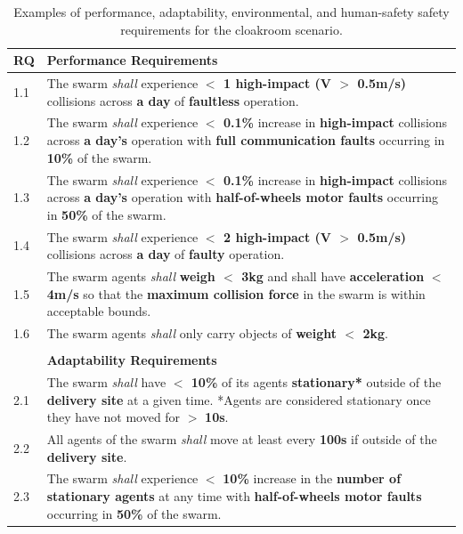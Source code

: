 \documentclass[runningheads]{llncs}
\begin{document}
\begin{table}[!t]
	\centering
	\caption{Examples of performance, adaptability, environmental, and human-safety safety requirements for the cloakroom scenario.}
	\label{tab:reqs}
	\begin{tabular}{p{5mm} p{125mm} }%
		\textbf{RQ} & \textbf{Performance Requirements}\\
		\hline
		1.1 & The swarm \emph{shall} experience \textbf{$<$ 1 high-impact (V $>$ 0.5m/s)} collisions across \textbf{a day} of \textbf{faultless} operation. \\ 
		\hline
		1.2 & The swarm \emph{shall} experience \textbf{$<$ 0.1\%} increase in \textbf{high-impact} collisions across \textbf{a day's} operation with \textbf{full communication faults} occurring in \textbf{10\%} of the swarm.\\ 
		\hline
		1.3 & The swarm \emph{shall} experience \textbf{$<$ 0.1\%} increase in \textbf{high-impact} collisions across \textbf{a day's} operation with \textbf{half-of-wheels motor faults} occurring in \textbf{50\%} of the swarm.	\\	
		\hline
		1.4 & The swarm \emph{shall} experience \textbf{$<$ 2 high-impact (V $>$ 0.5m/s)} collisions across \textbf{a day} of \textbf{faulty} operation.  \\		 		
		\hline
        1.5 & The swarm agents \emph{shall} \textbf{weigh $<$ 3kg} and shall have \textbf{acceleration} \textbf{$<$ 4m/s} so that the \textbf{maximum collision force} in the swarm is within acceptable bounds. \\
        \hline
        1.6 & The swarm agents \emph{shall} only carry objects of \textbf{weight $<$ 2kg}. \\ 
        \hline \\[-1.25\medskipamount]
		& \textbf{Adaptability Requirements}\\
		\hline
		2.1 & The swarm \emph{shall} have \textbf{$<$ 10\%} of its agents \textbf{stationary*} outside of the \textbf{delivery site} at a given time. *Agents are considered stationary once they have not moved for $>$ \textbf{10s}.
		\\ 
		\hline
		2.2 & All agents of the swarm \emph{shall} move at least every \textbf{100s} if outside of the \textbf{delivery site}.\\ 
		\hline
		2.3 & The swarm \emph{shall} experience $<$ \textbf{10\%} increase in the \textbf{number of stationary agents} at any time with \textbf{half-of-wheels motor faults} occurring in \textbf{50\%} of the swarm. \\

\end{tabular}
\end{table}
\end{document}

